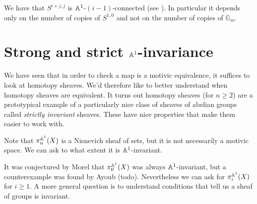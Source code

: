 \documentclass[11pt,openany]{book}
\begin{document}
\begin{example} We have that $S^{i+j,j}$ is $\mathbb{A}^1$-$(i-1)$-connected (see \cite[2.4.5]{AO-contractible}). In particular it depends only on the number of copies of $S^{1,0}$ and not on the number of copies of $\mathbb{G}_m$.
\end{example}








\section{Strong and strict $\mathbb{A}^1$-invariance}

\begin{goal} 
We have seen that in order to check a map is a motivic equivalence, it suffices to look at homotopy sheaves. We'd therefore like to better understand when homotopy sheaves are equivalent. It turns out homotopy sheaves (for $n\ge 2$) are a prototypical example of a particularly nice class of sheaves of abelian groups called \textit{strictly invariant} sheaves. These have nice properties that make them easier to work with.
\end{goal}



Note that $\pi_n^{\mathbb{A}^1}(X)$ is a Nisnevich sheaf of sets, but it is not necessarily a motivic space. We can ask to what extent it is $\mathbb{A}^1$-invariant.

It was conjectured by Morel that $\pi_0^{\mathbb{A}^1}(X)$ was always $\mathbb{A}^1$-invariant, but a counterexample was found by Ayoub (todo). Nevertheless we can ask for $\pi_i^{\mathbb{A}^1}(X)$ for $i\ge 1$. A more general question is to understand conditions that tell us a sheaf of groups is invariant.
\end{document}
